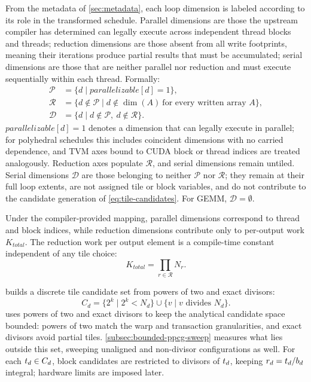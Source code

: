 From the metadata of \autoref{sec:metadata}, each loop dimension is labeled according to its role in the transformed schedule. Parallel dimensions are those the upstream compiler has determined can legally execute across independent thread blocks and threads; reduction dimensions are those absent from all write footprints, meaning their iterations produce partial results that must be accumulated; serial dimensions are those that are neither parallel nor reduction and must execute sequentially within each thread. Formally:
\begin{equation}
\begin{aligned}
\mathcal{P}
&= \{d \mid \mathit{parallelizable}[d] = 1\},\\
\mathcal{R}
&= \{d \notin \mathcal{P}
    \mid d \notin \dim(A)\ \text{for every written array } A\},\\
\mathcal{D}
&= \{d \mid d\notin\mathcal{P},\ d\notin\mathcal{R}\}.
\end{aligned}
\label{eq:dimension-roles}
\end{equation}
\(\mathit{parallelizable}[d]=1\) denotes a dimension that can legally execute in parallel; for polyhedral schedules this includes coincident dimensions with no carried dependence, and TVM axes bound to CUDA block or thread indices are treated analogously. Reduction axes populate \(\mathcal{R}\), and serial dimensions remain untiled. Serial dimensions \(\mathcal{D}\) are those belonging to neither \(\mathcal{P}\) nor \(\mathcal{R}\); they remain at their full loop extents, are not assigned tile or block variables, and do not contribute to the candidate generation of \autoref{eq:tile-candidates}. For GEMM, \(\mathcal{D}=\emptyset\).

Under the compiler-provided mapping, parallel dimensions correspond to thread and block indices, while reduction dimensions contribute only to per-output work \(K_{\mathit{total}}\). The reduction work per output element is a compile-time constant independent of any tile choice:
\begin{equation}
K_{\mathit{total}} = \prod_{r \in \mathcal{R}} N_r.
\label{eq:reduction-work}
\end{equation}

\name builds a discrete tile candidate set from powers of two and exact divisors:
\begin{equation}
C_d
= \{2^k \mid 2^k < N_d\}
  \cup \{v \mid v \text{ divides } N_d\}.
\label{eq:tile-candidates}
\end{equation}
\name uses powers of two and exact divisors to keep the analytical candidate space bounded: powers of two match the warp and transaction granularities, and exact divisors avoid partial tiles. \autoref{subsec:bounded-ppcg-sweep} measures what lies outside this set, sweeping unaligned and non-divisor configurations as well. For each \(t_d\in C_d\), block candidates are restricted to divisors of \(t_d\), keeping
\(r_d=t_d/b_d\) integral; hardware limits are imposed later.

